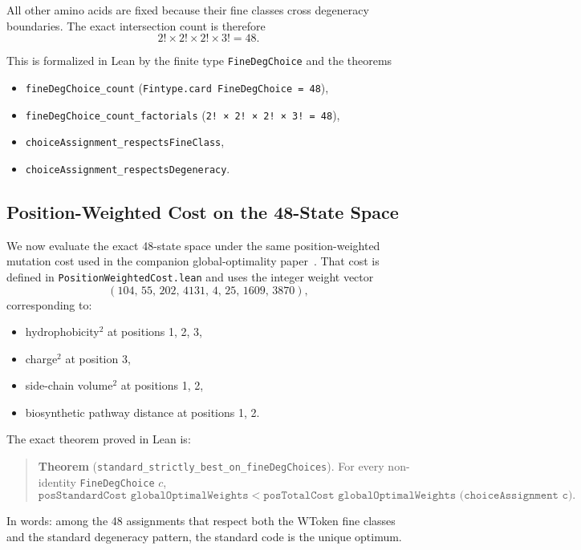 \documentclass[11pt,twocolumn]{article}
\begin{document}
All other amino acids are fixed because their fine classes cross degeneracy
boundaries. The exact intersection count is therefore
\[
2! \times 2! \times 2! \times 3! = 48.
\]

This is formalized in Lean by the finite type \texttt{FineDegChoice} and
the theorems
\begin{itemize}
\item \texttt{fineDegChoice\_count}
  (\texttt{Fintype.card FineDegChoice = 48}),
\item \texttt{fineDegChoice\_count\_factorials}
  (\texttt{2! × 2! × 2! × 3! = 48}),
\item \texttt{choiceAssignment\_respectsFineClass},
\item \texttt{choiceAssignment\_respectsDegeneracy}.
\end{itemize}

\subsection{Position-Weighted Cost on the 48-State Space}

We now evaluate the exact 48-state space under the same position-weighted
mutation cost used in the companion global-optimality paper~\cite{Paper2}.
That cost is defined in \texttt{PositionWeightedCost.lean} and uses the
integer weight vector
\[
(104,\,55,\,202,\,4131,\,4,\,25,\,1609,\,3870),
\]
corresponding to:
\begin{itemize}
\item hydrophobicity$^2$ at positions 1, 2, 3,
\item charge$^2$ at position 3,
\item side-chain volume$^2$ at positions 1, 2,
\item biosynthetic pathway distance at positions 1, 2.
\end{itemize}

The exact theorem proved in Lean is:

\begin{quote}
\textbf{Theorem}
(\texttt{standard\_strictly\_best\_on\_fineDegChoices}). For every
non-identity \texttt{FineDegChoice} $c$,
\[
\texttt{posStandardCost globalOptimalWeights}
<
\texttt{posTotalCost globalOptimalWeights (choiceAssignment c)}.
\]
\end{quote}

In words: among the 48 assignments that respect both the WToken fine
classes and the standard degeneracy pattern, the standard code is the
unique optimum.
\end{document}
